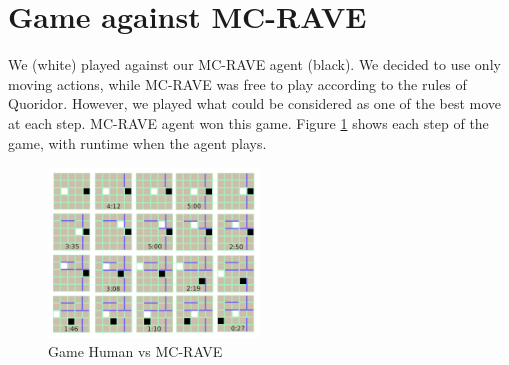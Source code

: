 \documentclass[journal, a4paper]{IEEEtran}
\begin{document}
\section*{Game against MC-RAVE}
\label{sec:game}
We (white) played against our MC-RAVE agent (black). We decided to use only moving actions, while MC-RAVE was free to play according to the rules of Quoridor. However, we played what could be considered as one of the best move at each step. MC-RAVE agent won this game. Figure \ref{fig:game} shows each step of the game, with runtime when the agent plays.

\begin{figure}
    \centering
    \includegraphics[width=0.5\textwidth]{figures/game.png}
    \caption{Game Human vs MC-RAVE}
    \label{fig:game}
\end{figure}



\end{document}
